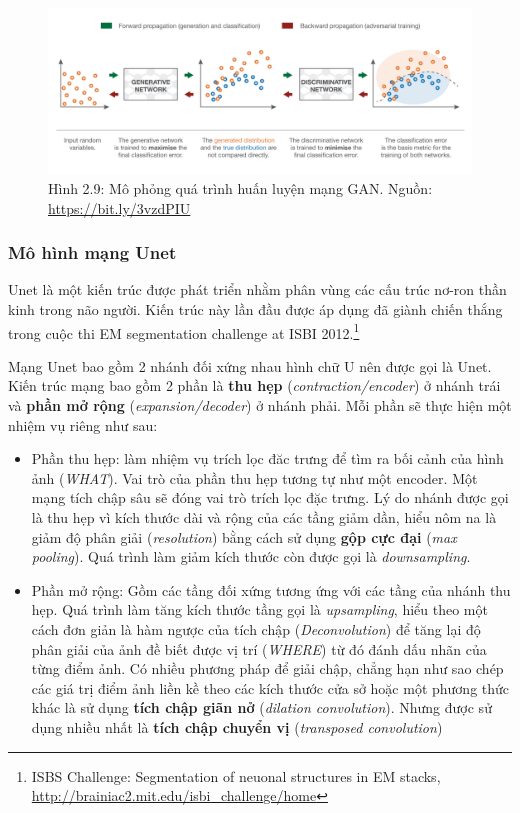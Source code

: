 \documentclass[a4paper]{article}
\begin{document}
\begin{figure}[h!]
\centering
\includegraphics[width=16.5cm]{images/2_72.png}
\caption{Hình 2.9: Mô phỏng quá trình huấn luyện mạng GAN. Nguồn: \href{https://bit.ly/3vzdPIU}{https://bit.ly/3vzdPIU}}
\end{figure}

\subsubsection{Mô hình mạng Unet}
Unet là một kiến trúc được phát triển nhằm phân vùng các cấu trúc nơ-ron thần kinh trong não người. Kiến trúc này lần đầu được áp dụng đã giành chiến thắng trong cuộc thi EM segmentation challenge at ISBI 2012.\footnote{ISBS Challenge: Segmentation of neuonal structures in EM stacks, \href{http://brainiac2.mit.edu/isbi\_challenge/home}{http://brainiac2.mit.edu/isbi\_challenge/home}}

\noindent
Mạng Unet bao gồm 2 nhánh đối xứng nhau hình chữ U nên được gọi là Unet. Kiến trúc mạng bao gồm 2 phần là \textbf{thu hẹp} (\textit{contraction/encoder}) ở nhánh trái và \textbf{phần mở rộng} (\textit{expansion/decoder}) ở nhánh phải. Mỗi phần sẽ thực hiện một nhiệm vụ riêng như sau:

\begin{itemize}
    \item Phần thu hẹp: làm nhiệm vụ trích lọc đăc trưng để tìm ra bối cảnh của hình ảnh (\textit{WHAT}). Vai trò của phần thu hẹp tương tự như một encoder. Một mạng tích chập sâu sẽ đóng vai trò trích lọc đặc trưng. Lý do nhánh được gọi là thu hẹp vì kích thước dài và rộng của các tầng giảm dần, hiểu nôm na là giảm độ phân giải (\textit{resolution}) bằng cách sử dụng \textbf{gộp cực đại} (\textit{max pooling}). Quá trình làm giảm kích thước còn được gọi là \textit{downsampling}.
    
    \item Phần mở rộng: Gồm các tầng đối xứng tương ứng với các tầng của nhánh thu hẹp. Quá trình làm tăng kích thước tầng gọi là \textit{upsampling}, hiểu theo một cách đơn giản là hàm ngược của tích chập (\textit{Deconvolution}) để tăng lại độ phân giải của ảnh đề biết được vị trí (\textit{WHERE}) từ đó đánh dấu nhãn của từng điểm ảnh. Có nhiều phương pháp để giải chập, chẳng hạn như sao chép các giá trị điểm ảnh liền kề theo các kích thước cửa sở hoặc một phương thức khác là sử dụng \textbf{tích chập giãn nở} (\textit{dilation convolution}). Nhưng được sử dụng nhiều nhất là \textbf{tích chập chuyển vị} (\textit{transposed convolution})
\end{itemize}
\end{document}
